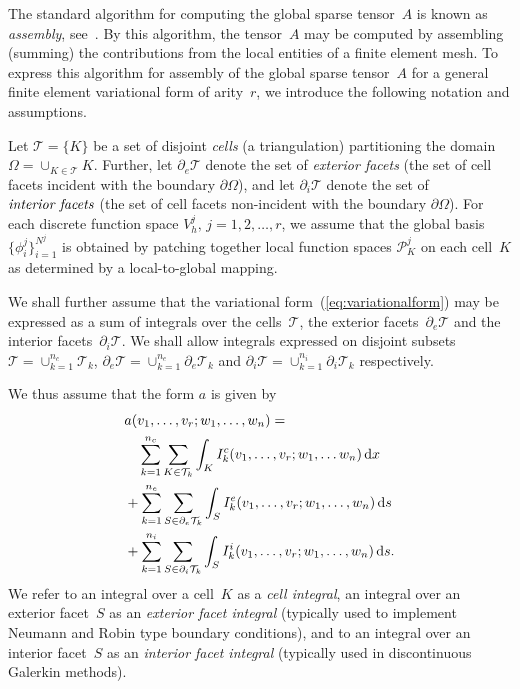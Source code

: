 The standard algorithm for computing the global sparse tensor~$A$ is
known as \emph{assembly}, see~\cite{ZieTay67,Hug87}. By this
algorithm, the tensor~$A$ may be computed by assembling (summing) the
contributions from the local entities of a finite element mesh.  To
express this algorithm for assembly of the global sparse tensor~$A$ for
a general finite element variational form of arity~$r$, we introduce
the following notation and assumptions.

Let $\mathcal{T} = \{K\}$ be a set of disjoint \emph{cells} (a
triangulation) partitioning the domain $\Omega =
\cup_{K\in\mathcal{T}} K$. Further, let $\partial_e \mathcal{T}$
denote the set of \emph{exterior facets} (the set of cell facets
incident with the boundary $\partial \Omega$), and let $\partial_i
\mathcal{T}$ denote the set of $\emph{interior facets}$ (the set of
cell facets non-incident with the boundary $\partial \Omega$).  For
each discrete function space $V_h^j, \, j=1,2,\ldots,r$, we assume
that the global basis~$\{\phi_i^j\}_{i=1}^{N^j}$ is obtained by
patching together local function spaces $\mathcal{P}_K^j$ on each
cell~$K$ as determined by a local-to-global mapping.

We shall further assume that the variational
form~(\ref{eq:variationalform}) may be expressed as a sum of integrals
over the cells~$\mathcal{T}$, the exterior facets~$\partial_e
\mathcal{T}$ and the interior facets~$\partial_i \mathcal{T}$. We
shall allow integrals expressed on disjoint subsets
$\mathcal{T} = \cup_{k=1}^{n_c} \mathcal{T}_k$,
$\partial_e \mathcal{T} = \cup_{k=1}^{n_e} \partial_e \mathcal{T}_k$
and
$\partial_i \mathcal{T} = \cup_{k=1}^{n_i} \partial_i \mathcal{T}_k$
respectively.

We thus assume that the form $a$ is given by
\begin{equation}
  \begin{split}
    & a(v_1, \ldots, v_r; w_1, \ldots,  w_n) =  \\
    &\ \ \   \sum_{k=1}^{n_c} \sum_{K\in\mathcal{T}_k} \int_{K}
    I^c_k(v_1, \ldots, v_r; w_1, \ldots w_n) \, \mathrm{d}x \\
    &+
    \sum_{k=1}^{n_e} \sum_{S\in\partial_e\mathcal{T}_k} \int_{S}
    I^e_k(v_1, \ldots, v_r; w_1, \ldots,  w_n) \, \mathrm{d}s \\
    &+
    \sum_{k=1}^{n_i} \sum_{S\in\partial_i\mathcal{T}_k} \int_{S}
    I^i_k(v_1, \ldots, v_r; w_1, \ldots, w_n) \, \mathrm{d}s.
  \end{split} \label{eq:form_integrals}
\end{equation}
We refer to an integral over a cell~$K$ as a \emph{cell integral},
an integral over an exterior facet~$S$ as an \emph{exterior facet integral}
(typically used to implement Neumann and Robin type boundary conditions),
and to an integral over an interior facet~$S$ as an \emph{interior facet integral} (typically used in discontinuous Galerkin methods).

